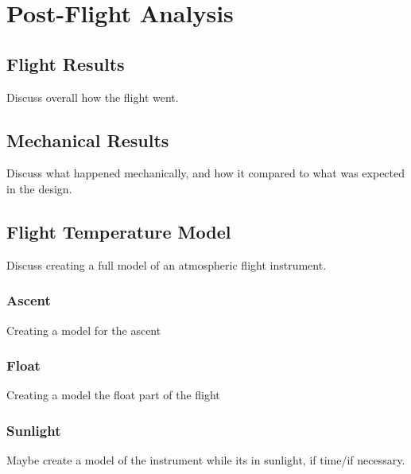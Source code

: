 \chapter{Post-Flight Analysis} \label{postflight}

\section{Flight Results}
Discuss overall how the flight went.

\section{Mechanical Results}
Discuss what happened mechanically, and how it compared to what was expected in the design.

\section{Flight Temperature Model}
Discuss creating a full model of an atmospheric flight instrument.

\subsection{Ascent}
Creating a model for the ascent

\subsection{Float}
Creating a model the float part of the flight

\subsection{Sunlight}
Maybe create a model of the instrument while its in sunlight, if time/if necessary.